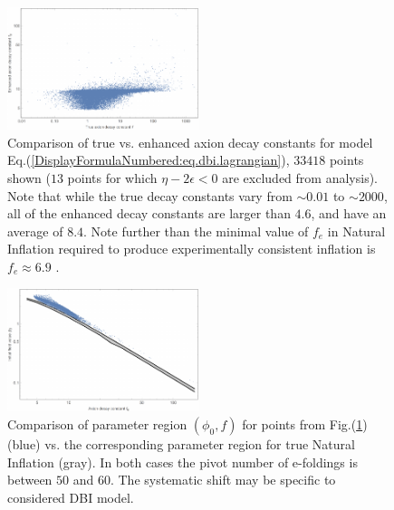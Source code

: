 \documentclass[12pt]{article}
\begin{document}
\begin{figure}
  \centering
  \includegraphics[width=0.5\textwidth]{figs/fige.pdf}
  \caption{Comparison of true vs. enhanced axion decay constants for model Eq.(\ref{DisplayFormulaNumbered:eq.dbi.lagrangian}), $33418$ points shown ($13$ points for which $\eta - 2\epsilon < 0$ are excluded from analysis). Note that while the true decay constants vary from $\sim 0.01$ to $\sim 2000$, all of the enhanced decay constants are larger than $4.6$, and have an average of $8.4$. Note further than the minimal value of ${f}_{e}$ in Natural Inflation required to produce experimentally consistent inflation is ${f}_{e} \approx 6.9$ \cite{Ade:2015lrj}.}
  \label{Figure:fig.enhancement.sim}
\end{figure}

\begin{figure}
  \centering
  \includegraphics[width=0.5\textwidth]{figs/figc.pdf}
  \caption{Comparison of parameter region $\left({\phi}_{0}, f\right)$ for points from Fig.(\ref{Figure:fig.enhancement.sim}) (blue) vs. the corresponding parameter region for true Natural Inflation (gray). In both cases the pivot number of e-foldings is between $50$ and $60$. The systematic shift may be specific to considered DBI model.}
  \label{fig.comparison.sim}
\end{figure}
\end{document}
